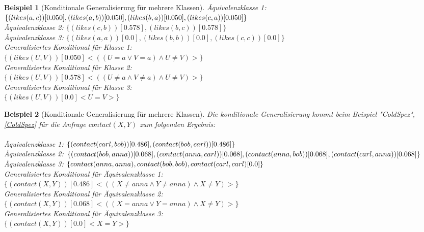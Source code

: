 \documentclass[draft]{scrreprt}
\newtheorem{Bsp}{Beispiel}[section]
\begin{document}
\begin{itemize}
\begin{itemize}
\begin{itemize}
\begin{Bsp}[Konditionale Generalisierung für mehrere Klassen]
				\noindent
			
				Äquivalenzklasse 1: $ \{(likes(a,c))[0.050], (likes(a,b))[0.050],\\ (likes(b,a))[0.050],\\ (likes(c,a))[0.050]\} $\\
				Äquivalenzklasse 2: $ \{(likes(c,b))[0.578], (likes(b,c))[0.578]\} $\\
				Äquivalenzklasse 3: $ \{(likes(a,a))[0.0], (likes(b,b))[0.0], (likes(c,c))[0.0]\} $\\
				
				\noindent
				Generalisiertes Konditional für Klasse 1: \\ $ \{(likes(U,V))[0.050] <((U = a \lor V = a)\land U \neq V)>\} $\\
				Generalisiertes Konditional für Klasse 2:\\ $ \{(likes(U,V))[0.578] <((U \neq a \land V \neq a) \land U \neq V)>\} $\\
				Generalisiertes Konditional für Klasse 3:\\ $ \{(likes(U,V))[0.0] <U = V>\} $\\
			\end{Bsp} 
			\begin{Bsp}[Konditionale Generalisierung für mehrere Klassen] Die konditionale Generalisierung kommt beim Beispiel "{}ColdSpez"{}, \ref{ColdSpez} für die Anfrage $ contact(X,Y) $ zum folgenden Ergebnis:\\
				\\
		
			Äquivalenzklasse 1: $ \{(contact(carl,bob))[0.486], \\ (contact(bob,carl))[0.486]\} $\\
			Äquivalenzklasse 2: $ \{(contact(bob,anna))[0.068], \\ (contact(anna, carl))[0.068],\\ (contact(anna, bob))[0.068],\\ (contact(carl, anna))[0.068]\} $ \\
			Äquivalenzklasse 3: $ \{ contact(anna,anna), contact(bob,bob), \\contact(carl,carl)[0.0]\} $\\
			
		
			\noindent
			Generalisiertes Konditional für Äquivalenzklasse 1:\\ $ \{(contact(X,Y))[0.486] <((X \neq anna \land Y \neq anna) \land X \neq Y)>\} $\\
			Generalisiertes Konditional für Äquivalenzklasse 2:\\ $ \{(contact(X,Y))[0.068] <((X = anna \lor Y = anna)\land X \neq Y)>\} $\\
			Generalisiertes Konditional für Äquivalenzklasse 3: \\$ \{(contact(X,Y))[0.0] <X = Y>\} $\\
		\end{Bsp} 


\end{itemize}
\end{itemize}
\end{itemize}
\end{document}
